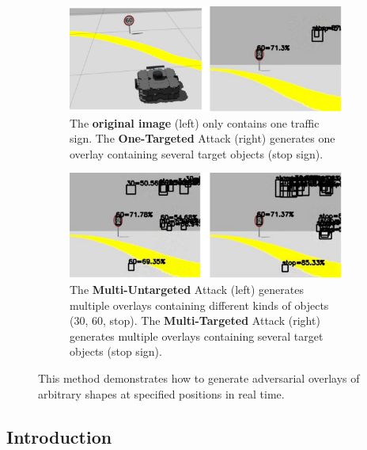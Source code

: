 \begin{figure}[H]
    \centering
    \begin{subfigure}[b]{\textwidth}
        \includegraphics[width=\textwidth]{figures/chapter_detection/detection/one.jpg}
        \caption{The \textbf{original image} (left) only contains one traffic sign. The \textbf{One-Targeted} Attack (right) generates one overlay containing several target objects (stop sign).}
        \label{fig:sparse-untar} 
    \end{subfigure}

    \begin{subfigure}[b]{\textwidth}
        \includegraphics[width=\textwidth]{figures/chapter_detection/detection/multi.jpg}
        \caption{The \textbf{Multi-Untargeted} Attack (left) generates multiple overlays containing different kinds of objects (30, 60, stop). The \textbf{Multi-Targeted} Attack (right) generates multiple overlays containing several target objects (stop sign).}
        \label{fig:dense-untar}
    \end{subfigure}
    \caption{This method demonstrates how to generate adversarial overlays of arbitrary shapes at specified positions in real time.}
    \label{fig:detection.overview}
\end{figure}

\subsection{Introduction}

